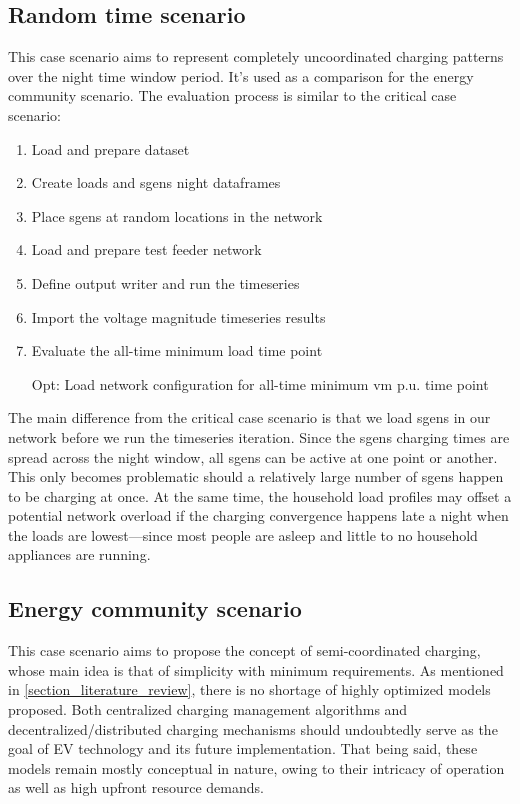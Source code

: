 \documentclass[a4paper,10pt]{report}
\begin{document}
\subsection{Random time scenario}
This case scenario aims to represent completely uncoordinated charging patterns over the night time window period. It's used as a comparison for the energy community scenario. The evaluation process is similar to the critical case scenario:
\begin{enumerate}
	\item Load and prepare dataset
	\item Create loads and sgens night dataframes
	\item Place sgens at random locations in the network
	\item Load and prepare test feeder network
	\item Define output writer and run the timeseries
	\item Import the voltage magnitude timeseries results
	\item Evaluate the all-time minimum load time point
	\item[Opt:] Load network configuration for all-time minimum vm p.u. time point
\end{enumerate}

The main difference from the critical case scenario is that we load sgens in our network before we run the timeseries iteration. Since the sgens charging times are spread across the night window, all sgens can be active at one point or another. This only becomes problematic should a relatively large number of sgens happen to be charging at once. At the same time, the household load profiles may offset a potential network overload if the charging convergence happens late a night when the loads are lowest---since most people are asleep and little to no household appliances are running.


\subsection{Energy community scenario}
This case scenario aims to propose the concept of semi-coordinated charging, whose main idea is that of simplicity with minimum requirements. As mentioned in  \cref{section_literature_review}, there is no shortage of highly optimized models proposed. Both centralized charging management algorithms and decentralized/distributed charging mechanisms should undoubtedly serve as the goal of EV technology and its future implementation. That being said, these models remain mostly conceptual in nature, owing to their intricacy of operation as well as high upfront resource demands.
\end{document}
